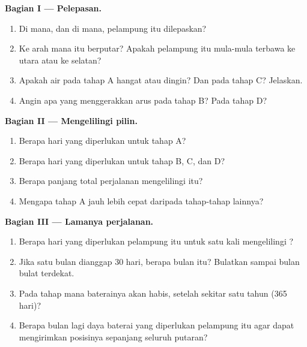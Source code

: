 \begin{problem}
\noindent\textbf{Bagian I --- Pelepasan.}\par\nopagebreak
\begin{enumerate}[beginpenalty=10000]
  \item Di  mana, dan di  mana, pelampung itu dilepaskan?
  \item Ke arah mana  itu berputar? Apakah pelampung itu mula-mula
        terbawa ke utara atau ke selatan?
  \item Apakah air pada tahap A hangat atau dingin? Dan pada tahap C?
        Jelaskan.
  \item Angin apa yang menggerakkan arus pada tahap B? Pada tahap D?
\end{enumerate}

\noindent\textbf{Bagian II --- Mengelilingi pilin.}\par\nopagebreak
\begin{enumerate}[resume, beginpenalty=10000]
  \item Berapa hari yang diperlukan untuk tahap A?
  \item Berapa hari yang diperlukan untuk tahap B, C, dan D?
  \item Berapa panjang total perjalanan mengelilingi  itu?
  \item Mengapa tahap A jauh lebih cepat daripada tahap-tahap lainnya?
\end{enumerate}

\noindent\textbf{Bagian III --- Lamanya perjalanan.}\par\nopagebreak
\begin{enumerate}[resume, beginpenalty=10000]
  \item Berapa hari yang diperlukan pelampung itu untuk satu kali
        mengelilingi ?
  \item Jika satu bulan dianggap 30 hari, berapa bulan itu? Bulatkan
        sampai bulan bulat terdekat.
  \item Pada tahap mana baterainya akan habis, setelah sekitar satu tahun
        (365 hari)?
  \item Berapa bulan lagi daya baterai yang diperlukan pelampung itu agar
        dapat mengirimkan posisinya sepanjang seluruh putaran?
\end{enumerate}
\end{problem}
